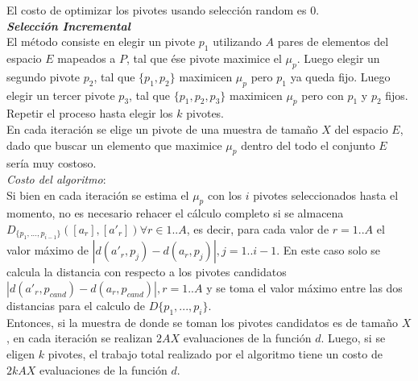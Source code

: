 El costo de optimizar los pivotes usando selecci\'on random es $0$.\\

\noindent \textit{\textbf{Selecci\'on Incremental}}\\

El m\'etodo consiste en elegir un pivote $p_1$ utilizando $A$ pares de elementos del espacio $E$ mapeados a $P$, tal que \'ese pivote maximice el $\mu_p$. Luego elegir un segundo pivote $p_2$, tal que $\{p_1,p_2\}$ maximicen $\mu_p$ pero $p_1$ ya queda fijo. Luego elegir un tercer pivote $p_3$, tal que $\{p_1,p_2,p_3\}$  maximicen $\mu_p$ pero con $p_1$ y  $p_2$ fijos. Repetir el proceso hasta elegir los $k$ pivotes.\\

En cada iteraci\'on se elige un pivote de una muestra de tama\~no $X$ del espacio $E$, dado que buscar un elemento que maximice $\mu_p$ dentro del todo el conjunto $E$  ser\'ia muy costoso.\\

\noindent \textit{Costo del algoritmo}:\\

Si bien en cada iteraci\'on se estima el $\mu_p$ con los $i$ pivotes seleccionados hasta el momento, no es necesario rehacer el c\'alculo completo si se almacena $D_{\{p_1,...,p_{i-1}\}}([a_r],[a'_r]) \forall r \in 1..A$, es decir, para cada valor de $r=1..A$ el valor m\'aximo de $|d(a'_r, p_j) - d(a_r, p_j)|, j = 1..i-1$. En este caso solo se calcula la distancia con respecto a los pivotes candidatos $|d(a'_r, p_{cand}) - d(a_r, p_{cand})|, r = 1..A$ y se toma el valor m\'aximo entre las dos distancias para el calculo de $D\{p_1, ...,p_i\}$.\\

Entonces, si la muestra de donde se toman los pivotes candidatos es de tama\~no $X$, en cada iteraci\'on se realizan $2AX$ evaluaciones de la funci\'on $d$. Luego, si se eligen $k$ pivotes, el trabajo total realizado por el algoritmo tiene un costo de $2kAX$ evaluaciones de la funci\'on $d$.
